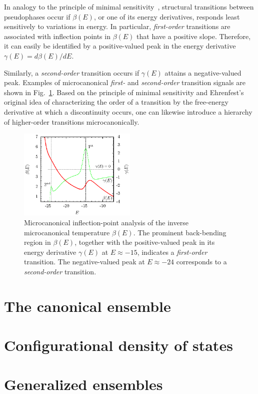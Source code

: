 \documentclass[12pt]{report}
\begin{document}
In analogy to the principle of minimal sensitivity~\cite{Stevenson}, structural transitions between pseudophases occur if $\beta (E)$, or one of its energy
derivatives, responds least sensitively to variations in energy. In particular, \textit{first-order} transitions are associated with inflection points in $\beta (E)$ that have a positive slope. Therefore, it can easily be identified by a positive-valued peak in the energy derivative $\gamma(E)=d\beta(E)/dE$. 

Similarly, a \textit{second-order} transition occurs if $\gamma(E)$ attains a negative-valued peak. Examples of microcanonical \textit{first-} and \textit{second-order} transition signals are shown in Fig.~\ref{fig:Fig_1}.
Based on the principle of minimal sensitivity and Ehrenfest's original idea of characterizing the order of a transition by the free-energy derivative at which a discontinuity occurs, one can likewise introduce a hierarchy of higher-order transitions microcanonically.

\begin{figure}
\includegraphics[width = 0.5\textwidth]{MicroAnalysisExample.eps}
\caption{\label{fig:Fig_1}%
Microcanonical inflection-point analysis of the inverse microcanonical temperature $\beta(E)$. The prominent back-bending region in $\beta(E)$, together with the positive-valued peak in its energy derivative $\gamma(E)$ at $E \approx -15$, indicates a \textit{first-order} transition. The negative-valued peak at $E\approx -24$ corresponds to a \textit{second-order} transition.}
\end{figure}

\section{The canonical ensemble}
\section{Configurational density of states}
\section{Generalized ensembles}
\end{document}
